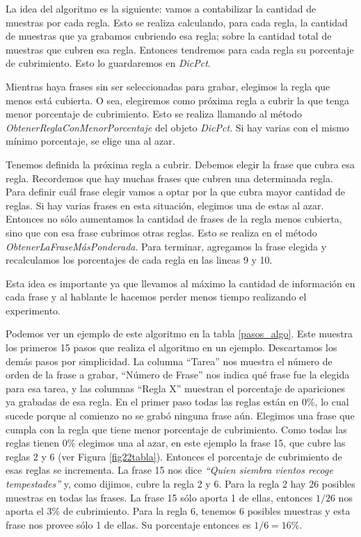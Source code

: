 La idea del algoritmo es la siguiente: vamos a contabilizar la cantidad de muestras por cada regla. Esto se realiza calculando, para cada regla, la cantidad de muestras que ya grabamos cubriendo esa regla; sobre la cantidad total de muestras que cubren esa regla. Entonces tendremos para cada regla su porcentaje de cubrimiento. Esto lo guardaremos en \textit{DicPct}.

Mientras haya frases sin ser seleccionadas para grabar, elegimos la regla que menos está cubierta. O sea, elegiremos como próxima regla a cubrir la que tenga menor porcentaje de cubrimiento. Esto se realiza llamando al método \textit{ObtenerReglaConMenorPorcentaje} del objeto \textit{DicPct}. Si hay varias con el mismo mínimo porcentaje, se elige una al azar.

Tenemos definida la próxima regla a cubrir. Debemos elegir la frase que cubra esa regla. Recordemos que hay muchas frases que cubren una determinada regla. Para definir cuál frase elegir vamos a optar por la que cubra mayor cantidad de reglas. Si hay varias frases en esta situación, elegimos una de estas al azar. Entonces no sólo aumentamos la cantidad de frases de la regla menos cubierta, sino que con esa frase cubrimos otras reglas. Esto se realiza en el método \textit{ObtenerLaFraseMásPonderada}. Para terminar, agregamos la frase elegida y recalculamos los porcentajes de cada regla en las lineas 9 y 10.

Esta idea es importante ya que llevamos al máximo la cantidad de información en cada frase y al hablante le hacemos perder menos tiempo realizando el experimento.

Podemos ver un ejemplo de este algoritmo en la tabla \ref{pasos_algo}. Este muestra los primeros 15 pasos que realiza el algoritmo en un ejemplo. Descartamos los demás pasos por simplicidad. La columna ``Tarea'' nos muestra el número de orden de la frase a grabar, ``Número de Frase'' nos indica qué frase fue la elegida para esa tarea, y las columnas ``Regla X'' muestran el porcentaje de apariciones ya grabadas de esa regla. En el primer paso todas las reglas están en 0\%, lo cual sucede porque al comienzo no se grabó ninguna frase aún.  Elegimos una frase que cumpla con la regla que tiene menor porcentaje de cubrimiento. Como todas las reglas tienen 0\% elegimos una al azar, en este ejemplo la frase 15, que cubre las reglas 2 y 6 (ver Figura \ref{fig22tabla}). Entonces el porcentaje de cubrimiento de esas reglas se incrementa. 
La frase 15 nos dice \textit{``Quien siembra vientos recoge tempestades''} y, como dijimos, cubre la regla 2 y 6. Para la regla 2 hay 26 posibles muestras en todas las frases. La frase 15 sólo aporta 1 de ellas, entonces $1/26$ nos aporta el 3\% de cubrimiento. Para la regla 6, tenemos 6 posibles muestras y esta frase nos provee sólo 1 de ellas. Su porcentaje entonces es $1/6 = 16\%$. 

